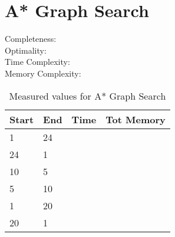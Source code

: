 \section{A* Graph Search}
\begin{description}
\item[Completeness:			]
\item[Optimality:				]
\item[Time Complexity:	]
\item[Memory Complexity:]
\end{description}

\begin{table}[h]
\centering
\begin{tabular}{	p{} p{} 
									p{} p{} }\hline
	Start & End & Time & Tot Memory \\\hline
	1		&	24 	& 	&	\\
	24	&	1 	& 	&	\\
	10	&	5 	& 	&	\\
	5		&	10 	& 	&	\\
	1		&	20 	& 	&	\\
	20	&	1		&		&	\\
\end{tabular}
\caption{Measured values for A* Graph Search}\label{tbl:sumGraph}
\end{table}




